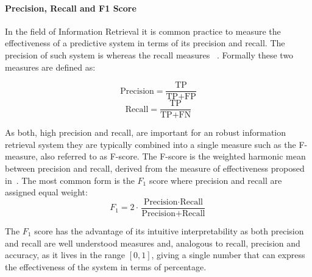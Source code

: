 \cite[Chapter 8.3, p.~155]{Manning:2008aa}

\paragraph{Precision, Recall and F1 Score}
\label{par:Precision, Recall and F1 Score}

In the field of Information Retrieval it is common practice to measure the effectiveness of a predictive system in terms of its precision and recall.
The precision of such system is  whereas the recall measures ~\cite{Rijsbergen:1979aa}. Formally these two measures are defined as:

\begin{equation}
    \text{Precision} = \frac{\text{TP}}{\text{TP} + \text{FP}}
\end{equation}
\begin{equation}
    \text{Recall} = \frac{\text{TP}}{\text{TP} + \text{FN}}
\end{equation}


As both, high precision and recall, are important for an robust information retrieval system they are typically combined into a single measure such as the F-measure, also referred to as F-score. The F-score is the weighted harmonic mean between precision and recall, derived from the measure of effectiveness proposed in~\cite{Rijsbergen:1979aa}. The most common form is the $F_1$ score  where precision and recall are assigned equal weight:
\begin{equation}
  \label{f1measure}
  F_1 = 2 \cdot \frac{\text{Precision} \cdot \text{Recall}}{\text{Precision} + \text{Recall}}
\end{equation}

The $F_1$ score has the advantage of its intuitive interpretability as both precision and recall are well understood measures and, analogous to recall, precision and accuracy, as it lives in the range $[0,1]$, giving a single number that can express the effectiveness of the system in terms of percentage.

